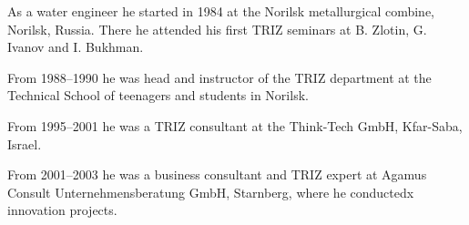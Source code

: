 \documentclass[11pt,a4paper]{article}
\begin{document}
As a water engineer he started in 1984 at the Norilsk metallurgical combine,
Norilsk, Russia.  There he attended his first TRIZ seminars at B. Zlotin,
G. Ivanov and I. Bukhman.

From 1988--1990 he was head and instructor of the TRIZ department at the
Technical School of teenagers and students in Norilsk.

From 1995--2001 he was a TRIZ consultant at the Think-Tech GmbH, Kfar-Saba,
Israel.

From 2001--2003 he was a business consultant and TRIZ expert at Agamus Consult
Unternehmensberatung GmbH, Starnberg, where he conductedx innovation projects.
\end{document}
